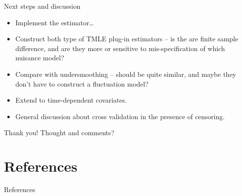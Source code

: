 \documentclass[smaller]{beamer}\usepackage{listings}
\begin{document}
\begin{frame}[label={sec:org166f364}]{Next steps and discussion}
\begin{itemize}
\item Implement the estimator\ldots{}
\item Construct both type of TMLE plug-in estimators -- is the are finite sample difference, and are
they more or sensitive to mis-specification of which nuisance model?
\item Compare with undersmoothing -- should be quite similar, and maybe they don't have to construct a
fluctuation model?
\item Extend to time-dependent covariates.
\item General discussion about cross validation in the presence of censoring.
\end{itemize}
\end{frame}

\begin{frame}[label={sec:org403ed21}]{Thank you!}
\centering Thought and comments?
\end{frame}

\section{References}
\label{sec:org3c4f5f4}

\begin{frame}[label={sec:orgc674143}]{References}
\small 
\end{frame}
\end{document}
